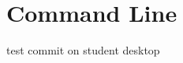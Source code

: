 \chapter{Command Line}
\hypertarget{md__read_me}{}\label{md__read_me}
\label{md__read_me_autotoc_md0}%
%




test commit on student desktop 